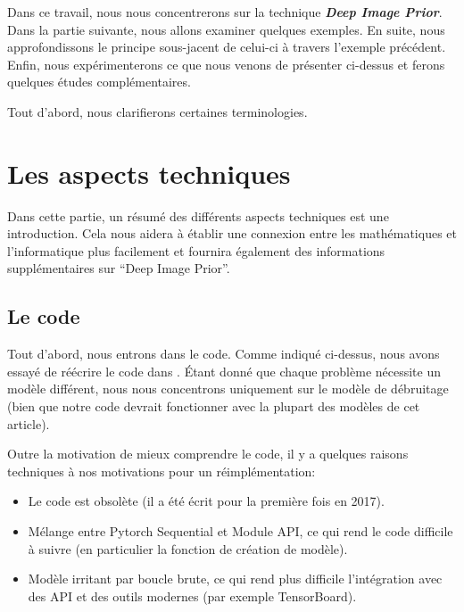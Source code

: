 \documentclass[
  12pt,
  dvipsnames]{article}
\providecommand{\tightlist}{%
  \setlength{\itemsep}{0pt}\setlength{\parskip}{0pt}}
\begin{document}
Dans ce travail, nous nous concentrerons sur la technique \textbf{\emph{Deep Image Prior}}. Dans la partie suivante, nous allons examiner quelques exemples. En suite, nous approfondissons le principe sous-jacent de celui-ci à travers l'exemple précédent. Enfin, nous expérimenterons ce que nous venons de présenter ci-dessus et ferons quelques études complémentaires.

Tout d'abord, nous clarifierons certaines terminologies.

\newpage

\hypertarget{les-aspects-techniques}{%
\section{Les aspects techniques}\label{les-aspects-techniques}}

Dans cette partie, un résumé des différents aspects techniques est une introduction. Cela nous aidera à établir une connexion entre les mathématiques et l'informatique plus facilement et fournira également des informations supplémentaires sur ``Deep Image Prior''.

\hypertarget{le-code}{%
\subsection{Le code}\label{le-code}}

Tout d'abord, nous entrons dans le code. Comme indiqué ci-dessus, nous avons essayé de réécrire le code dans \autocite{1711.10925}. Étant donné que chaque problème nécessite un modèle différent, nous nous concentrons uniquement sur le modèle de débruitage (bien que notre code devrait fonctionner avec la plupart des modèles de cet article).

Outre la motivation de mieux comprendre le code, il y a quelques raisons techniques à nos motivations pour un réimplémentation:

\begin{itemize}
\tightlist
\item
  Le code est obsolète (il a été écrit pour la première fois en 2017).
\item
  Mélange entre Pytorch Sequential et Module API, ce qui rend le code difficile à suivre (en particulier la fonction de création de modèle).
\item
  Modèle irritant par boucle brute, ce qui rend plus difficile l'intégration avec des API et des outils modernes (par exemple TensorBoard).
\end{itemize}
\end{document}
